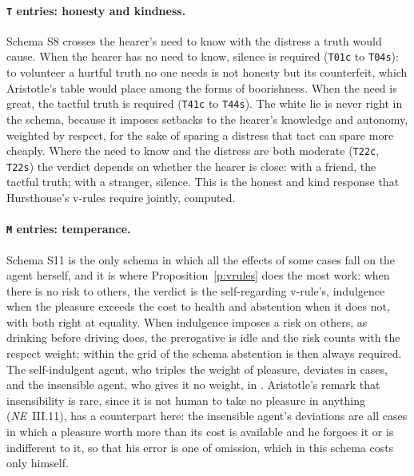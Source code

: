 \documentclass{situationist-preprint}
\begin{document}
\paragraph{\texttt{T} entries: honesty and kindness.} Schema S8 crosses the hearer's need to know with the distress a truth would cause. When the hearer has no need to know, silence is required (\texttt{T01c} to \texttt{T04s}): to volunteer a hurtful truth no one needs is not honesty but its counterfeit, which Aristotle's table would place among the forms of boorishness. When the need is great, the tactful truth is required (\texttt{T41c} to \texttt{T44s}). The white lie is never right in the schema, because it imposes setbacks to the hearer's knowledge and autonomy, weighted by respect, for the sake of sparing a distress that tact can spare more cheaply. Where the need to know and the distress are both moderate (\texttt{T22c}, \texttt{T22s}) the verdict depends on whether the hearer is close: with a friend, the tactful truth; with a stranger, silence. This is the honest and kind response that Hursthouse's v-rules require jointly, computed.

\paragraph{\texttt{M} entries: temperance.} Schema S11 is the only schema in which all the effects of some cases fall on the agent herself, and it is where Proposition~\ref{p:vrules} does the most work: when there is no risk to others, the verdict is the self-regarding v-rule's, indulgence when the pleasure exceeds the cost to health and abstention when it does not, with both right at equality. When indulgence imposes a risk on others, as drinking before driving does, the prerogative is idle and the risk counts with the respect weight; within the grid of the schema abstention is then always required. The self-indulgent agent, who triples the weight of pleasure, deviates in \stnviceselfindulgent{} cases, and the insensible agent, who gives it no weight, in \stnviceinsensible{}. Aristotle's remark that insensibility is rare, since it is not human to take no pleasure in anything (\emph{NE}~III.11), has a counterpart here: the insensible agent's deviations are all cases in which a pleasure worth more than its cost is available and he forgoes it or is indifferent to it, so that his error is one of omission, which in this schema costs only himself.
\end{document}
